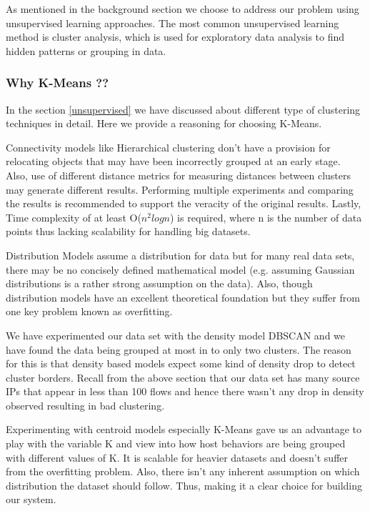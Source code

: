 As mentioned in the background section we choose to address our problem using unsupervised learning approaches. The most common unsupervised learning method is cluster analysis, which is used for exploratory data analysis to find hidden patterns or grouping in data. 

\subsubsection*{Why K-Means ??}
 In the section \ref{unsupervised} we have discussed about different type of clustering techniques in detail. Here we provide a reasoning for choosing K-Means.
 
Connectivity models like Hierarchical clustering don't have a provision for relocating objects that may have been incorrectly grouped at an early stage. Also, use of different distance metrics for measuring distances between clusters may generate different results. Performing multiple experiments and comparing
the results is recommended to support the veracity of
the original results. Lastly, Time complexity of at least O($n^2logn$) is required, where n is the number of data points thus lacking scalability for handling big datasets.

Distribution Models assume a distribution for data but for many real data sets, there may be no concisely defined mathematical model (e.g. assuming Gaussian distributions is a rather strong assumption on the data). Also, though distribution models have an excellent  theoretical foundation but they suffer from one key problem known as overfitting. 

We have experimented our data set with the density model DBSCAN and we have found the data being grouped at most in to only two clusters. The reason for this is that density based models expect some kind of density drop to detect cluster borders. Recall from the above section that our data set has many source IPs that appear in less than 100 flows and hence there wasn't any drop in density observed resulting in bad clustering.

Experimenting with centroid models especially K-Means gave us an advantage to play with the variable K and view into how host behaviors are being grouped with different values of K. It is scalable for heavier datasets and doesn't suffer from the overfitting problem. Also, there isn't any inherent assumption on which distribution the dataset should follow. Thus, making it a clear choice for building our system.


